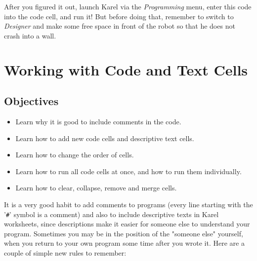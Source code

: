 \documentclass[article,A4,12pt]{llncs}
\begin{document}
\noindent
After you figured it out, launch Karel via the {\em Programming} menu, enter this code into
the code cell, and run it! But before doing that, remember to switch to {\em Designer} and make 
some free space in front of the robot 
so that he does not crash into a wall.


\section{Working with Code and Text Cells} \label{sec:editmenu}

\subsection{Objectives} 
 
\begin{itemize}
\item Learn why it is good to include comments in the code.
\item Learn how to add new code cells and descriptive text cells.
\item Learn how to change the order of cells.
\item Learn how to run all code cells at once, and how to run them individually.
\item Learn how to clear, collapse, remove and merge cells.
\end{itemize}
It is a very good habit to add comments to programs (every line starting with the '{\tt \#}'
symbol is a comment) and also to include descriptive 
texts in Karel worksheets, since descriptions make it easier for someone else to 
understand your program. Sometimes you may be in the position of the "someone else" yourself,
when you return to your own program some time after you wrote it. Here are a couple of 
simple new rules to remember:
\end{document}
